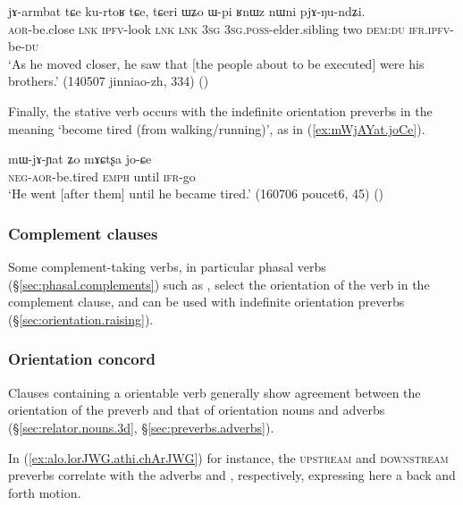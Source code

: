 \begin{exe}
\ex \label{ex:jarmbat.kurtoR}
\gll  jɤ-armbat tɕe ku-rtoʁ tɕe, tɕeri ɯʑo ɯ-pi ʁnɯz nɯni pjɤ-ŋu-ndʑi. \\
\textsc{aor}-be.close \textsc{lnk} \textsc{ipfv}-look \textsc{lnk} \textsc{lnk} \textsc{3sg} \textsc{3sg}.\textsc{poss}-elder.sibling two \textsc{dem}:\textsc{du} \textsc{ifr}.\textsc{ipfv}-be-\textsc{du} \\
\glt `As he moved closer, he saw that [the people about to be executed] were his brothers.' (140507 jinniao-zh, 334) ()
\end{exe}

Finally, the stative verb  occurs with the indefinite orientation preverbs in the meaning `become tired (from walking/running)', as in (\ref{ex:mWjAYat.joCe}).

\begin{exe}
\ex \label{ex:mWjAYat.joCe}
\gll mɯ-jɤ-ɲat ʑo mɤɕtʂa jo-ɕe \\
\textsc{neg}-\textsc{aor}-be.tired \textsc{emph} until \textsc{ifr}-go \\
\glt `He went [after them] until he became tired.' (160706 poucet6, 45) ()
\end{exe}

\subsubsection{Complement clauses} \label{sec:orientation.complement.clause}
Some com\-ple\-ment-taking verbs, in particular phasal verbs (§\ref{sec:phasal.complements}) such as , select the orientation of the verb in the complement clause, and can be used with indefinite orientation preverbs (§\ref{sec:orientation.raising}). 

\subsubsection{Orientation concord} \label{sec:orientation.concord}
Clauses containing a orientable verb generally show agreement between the orientation of the preverb and that of orientation nouns and adverbs
(§\ref{sec:relator.nouns.3d}, §\ref{sec:preverbs.adverbs}). 

In (\ref{ex:alo.lorJWG.athi.chArJWG}) for instance, the \textsc{upstream}  and  \textsc{downstream} preverbs   correlate with the adverbs  and , respectively, expressing here a back and forth motion.

